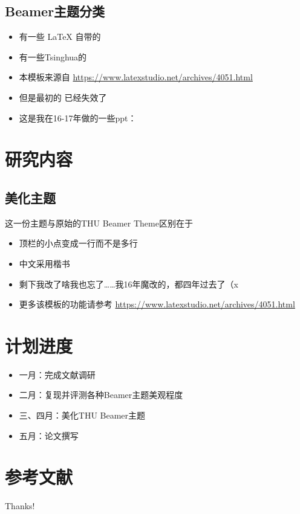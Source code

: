 \documentclass{beamer}
\begin{document}
\subsection{Beamer主题分类}

\begin{frame}
\begin{itemize}
\item 有一些 \LaTeX{} 自带的
\item 有一些Tsinghua的
\item 本模板来源自 \newline \url{https://www.latexstudio.net/archives/4051.html}
\item 但是最初的 \href{http://far.tooold.cn/post/latex/beamertsinghua}{\color{purple}{link}} \cite{origin}已经失效了
\item 这是我在16-17年做的一些ppt：\href{https://github.com/Trinkle23897/oi_slides}{\color{purple}{戳我}}
\end{itemize}
\end{frame}

\section{研究内容}

\subsection{美化主题}

\begin{frame}{这一份主题与原始的THU Beamer Theme区别在于}
\begin{itemize}
\item 顶栏的小点变成一行而不是多行
\item 中文采用楷书
\item 剩下我改了啥我也忘了……我16年魔改的，都四年过去了（x
\item 更多该模板的功能请参考 \url{https://www.latexstudio.net/archives/4051.html}
\end{itemize}
\end{frame}

\section{计划进度}
\begin{frame}
	\begin{itemize}
\item 一月：完成文献调研
\item 二月：复现并评测各种Beamer主题美观程度
\item 三、四月：美化THU Beamer主题
\item 五月：论文撰写
	\end{itemize}
\end{frame}

\section{参考文献}

\begin{frame}[allowframebreaks]


\end{frame}

\begin{frame}
\begin{center}
{\Huge\calligra Thanks!}
\end{center}
\end{frame}
\end{document}
